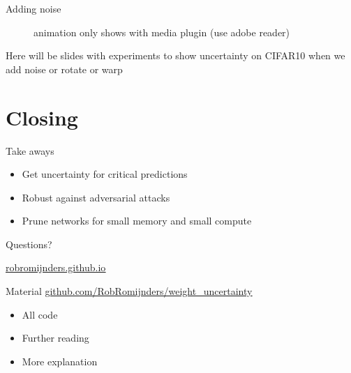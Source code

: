 \documentclass{beamer}
\newcommand{\mdlink}[2]{\href{#2}{\underline{#1}}}
\begin{document}
\begin{frame}{Adding noise}
	\begin{figure}
		\centering
		\hspace*{-25mm}
		\caption{animation only shows with media plugin (use adobe reader)}
	\end{figure}
\end{frame}


\else

\begin{frame}
	Here will be slides with experiments to show uncertainty on CIFAR10 when we add noise or rotate or warp
\end{frame}

\fi

\section{Closing}
\begin{frame}
	\centerline{Take aways}
	\begin{itemize}
		\item Get uncertainty for critical predictions
		\item Robust against adversarial attacks
		\item Prune networks for small memory and small compute
	\end{itemize}
\end{frame}

\begin{frame}
	\centerline{\Huge{Questions?}}
		
	\centerline{  }
	\centerline{\mdlink{robromijnders.github.io}{http://robromijnders.github.io/}}
	\centerline{  }
		
	\begin{block}{Material}
		\mdlink{\url{github.com/RobRomijnders/weight_uncertainty}}{github.com/RobRomijnders/weight_uncertainty}
		\centerline{  }
		\begin{itemize}
			\item All code
			\item Further reading
			\item More explanation
		\end{itemize}
	\end{block}
\end{frame}
\end{document}
